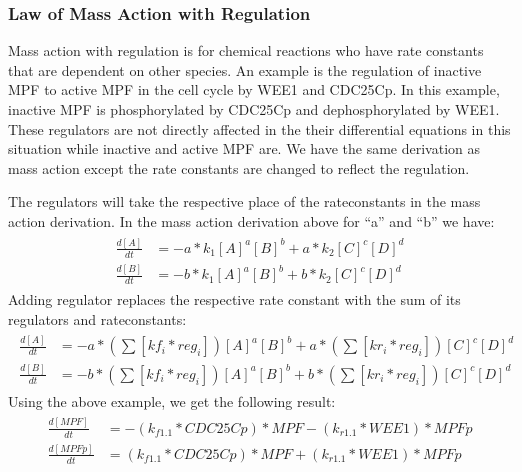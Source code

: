 \documentclass[letterpaper,10pt,english]{sphinxmanual}
\begin{document}
\subsubsection{Law of Mass Action with Regulation}
\label{\detokenize{pages/backend/eqn_info/1_chem_eqns:law-of-mass-action-with-regulation}}
\sphinxAtStartPar
Mass action with regulation is for chemical reactions who have rate constants
that are dependent on other species. An example is the regulation of inactive
MPF to active MPF in the cell cycle by WEE1 and CDC25Cp. In this example,
inactive MPF is phosphorylated by CDC25Cp and dephosphorylated by WEE1. These
regulators are not directly affected in the their differential equations in
this situation while inactive and active MPF are. We have the same derivation
as mass action except the rate constants are changed to reflect the regulation.

\begin{figure}[htbp]
\centering

\noindent{}
\end{figure}

\sphinxAtStartPar
The regulators will take the respective place of the rateconstants in the
mass action derivation.  In the mass action derivation above for “a” and “b”
we have:
\begin{equation*}
\begin{split}\begin{align*}
    \frac{d[A]}{dt} &= -a*k_1[A]^a[B]^b + a*k_2[C]^c[D]^d \\
    \frac{d[B]}{dt} &= -b*k_1[A]^a[B]^b + b*k_2[C]^c[D]^d
\end{align*}\end{split}
\end{equation*}
\sphinxAtStartPar
Adding regulator replaces the respective rate constant with the sum of
its regulators and rateconstants:
\begin{equation*}
\begin{split}\begin{align*}
    \frac{d[A]}{dt} &= -a*(\sum{[kf_i*reg_i]})[A]^a[B]^b +
    a*(\sum{[kr_i*reg_i]})[C]^c[D]^d \\
    \frac{d[B]}{dt} &= -b*(\sum{[kf_i*reg_i]})[A]^a[B]^b +
    b*(\sum{[kr_i*reg_i]})[C]^c[D]^d
\end{align*}\end{split}
\end{equation*}
\sphinxAtStartPar
Using the above example, we get the following result:
\begin{equation*}
\begin{split}\begin{align*}
    \frac{d[MPF]}{dt} &= -(k_{f1.1}*CDC25Cp)*MPF - (k_{r1.1}*WEE1)*MPFp \\
    \frac{d[MPFp]}{dt} &= (k_{f1.1}*CDC25Cp)*MPF + (k_{r1.1}*WEE1)*MPFp
\end{align*}\end{split}
\end{equation*}
\end{document}

